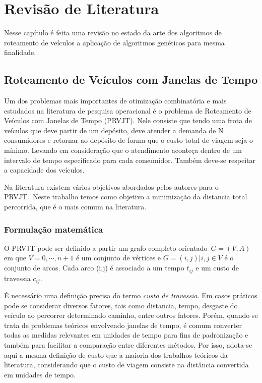 \chapter[Revisão de Literatura]{Revisão de Literatura}


Nesse capítulo é feita uma revisão no estado da arte dos algoritmos de roteamento de veículos a aplicação de algoritmos genéticos para mesma finalidade.

\section{Roteamento de Veículos com Janelas de Tempo}

Um dos problemas mais importantes de otimização combinatória e mais estudados na literatura de pesquisa operacional é o problema de Roteamento de Veículos com Janelas de Tempo (PRVJT).
Nele consiste que tendo uma frota de veículos que deve partir de um depósito, deve atender a demanda de N consumidores e retornar ao depósito de forma que o custo total de viagem seja o mínimo. Levando em consideração que o atendimento aconteça dentro de um intervalo de tempo especificado para cada consumidor. Também deve-se respeitar a capacidade dos veículos.

Na literatura existem vários objetivos abordados pelos autores para o PRVJT.\ Neste trabalho temos como objetivo a minimização da distancia total percorrida, que é o mais comum na literatura.~\cite{ROCHAT}

\subsection{Formulação matemática}

O PRVJT pode ser definido a partir um grafo completo orientado~\(G = (V,A)\) em que \(V = {0,\cdots,n+1}\) é um conjunto de vértices e \(G ={(i,j)|i,j \in V}\) é o conjunto de arcos.
Cada arco (i,j) é associado a um tempo \(t_{ij}\) e um custo de travessia \(c_{ij}\).

É necessário uma definição precisa do termo \textit{custo de travessia}. Em casos práticos pode se considerar diversos fatores, tais como distancia, tempo, desgaste do veículo ao percorrer determinado caminho, entre outros fatores. Porém, quando se trata de problemas teóricos envolvendo janelas de tempo, é comum converter todas as medidas relevantes em unidades de tempo para fins de padronização e também para facilitar a comparação entre diferentes métodos. Por isso, adota-se aqui a mesma definição de custo que a maioria dos trabalhos teóricos da literatura, considerando que o custo de viagem consiste na distância convertida em unidades de tempo.

